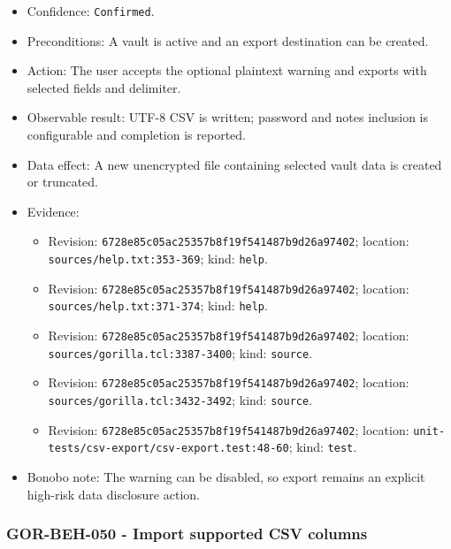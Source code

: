 \documentclass[
  letterpaper,
]{article}
\newcommand{\passthrough}[1]{#1}
\providecommand{\tightlist}{%
  \setlength{\itemsep}{0pt}\setlength{\parskip}{0pt}}
\begin{document}
\begin{itemize}
\tightlist
\item
  Confidence: \passthrough{\lstinline!Confirmed!}.
\item
  Preconditions: A vault is active and an export destination can be created.
\item
  Action: The user accepts the optional plaintext warning and exports with selected fields and delimiter.
\item
  Observable result: UTF-8 CSV is written; password and notes inclusion is configurable and completion is reported.
\item
  Data effect: A new unencrypted file containing selected vault data is created or truncated.
\item
  Evidence:

  \begin{itemize}
  \tightlist
  \item
    Revision: \nolinkurl{6728e85c05ac25357b8f19f541487b9d26a97402}; location: \nolinkurl{sources/help.txt:353-369};
    kind: \passthrough{\lstinline!help!}.
  \item
    Revision: \nolinkurl{6728e85c05ac25357b8f19f541487b9d26a97402}; location: \nolinkurl{sources/help.txt:371-374};
    kind: \passthrough{\lstinline!help!}.
  \item
    Revision: \nolinkurl{6728e85c05ac25357b8f19f541487b9d26a97402}; location: \nolinkurl{sources/gorilla.tcl:3387-3400};
    kind: \passthrough{\lstinline!source!}.
  \item
    Revision: \nolinkurl{6728e85c05ac25357b8f19f541487b9d26a97402}; location: \nolinkurl{sources/gorilla.tcl:3432-3492};
    kind: \passthrough{\lstinline!source!}.
  \item
    Revision: \nolinkurl{6728e85c05ac25357b8f19f541487b9d26a97402}; location:
    \nolinkurl{unit-tests/csv-export/csv-export.test:48-60}; kind: \passthrough{\lstinline!test!}.
  \end{itemize}
\item
  Bonobo note: The warning can be disabled, so export remains an explicit high-risk data disclosure action.
\end{itemize}

\subsubsection{GOR-BEH-050 - Import supported CSV columns}\label{gor-beh-050---import-supported-csv-columns}
\end{document}
